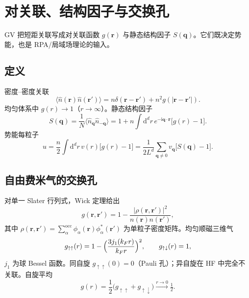 \section{对关联、结构因子与交换孔}

GV 把短距关联写成对关联函数 $g(\mathbf{r})$ 与静态结构因子 $S(\mathbf{q})$。它们既决定势能，也是 RPA/局域场理论的输入。

\subsection{定义}

密度--密度关联
\begin{equation}
  \bigl\langle
  \hat n(\mathbf{r})\hat n(\mathbf{r}')
  \bigr\rangle
  =n\delta(\mathbf{r}-\mathbf{r}')
  +n^2 g(|\mathbf{r}-\mathbf{r}'|).
\end{equation}
均匀体系中 $g(r)\to1$（$r\to\infty$）。静态结构因子
\begin{equation}
  S(\mathbf{q})
  =\frac{1}{N}
  \bigl\langle
  \hat n_{\mathbf{q}}\hat n_{-\mathbf{q}}
  \bigr\rangle
  =1+n\int\mathrm{d}^d r\,e^{-\mathrm{i}\mathbf{q}\cdot\mathbf{r}}
  \bigl[g(r)-1\bigr].
\label{eq:Sq_gr}
\end{equation}
势能每粒子
\begin{equation}
  u
  =\frac{n}{2}
  \int\mathrm{d}^d r\,v(r)\bigl[g(r)-1\bigr]
  =\frac{1}{2L^d}
  \sum_{\mathbf{q}\neq0}
  v_{\mathbf{q}}\bigl[S(\mathbf{q})-1\bigr].
\label{eq:u_from_S}
\end{equation}

\subsection{自由费米气的交换孔}

对单一 Slater 行列式，Wick 定理给出
\begin{equation}
  g(\mathbf{r},\mathbf{r}')
  =1-\frac{|\rho(\mathbf{r},\mathbf{r}')|^2}{n(\mathbf{r})n(\mathbf{r}')},
\label{eq:g_slater}
\end{equation}
其中 $\rho(\mathbf{r},\mathbf{r}')=\sum_{\alpha}^{\mathrm{occ}}\phi_\alpha(\mathbf{r})\phi_\alpha^*(\mathbf{r}')$ 为单粒子密度矩阵。均匀顺磁三维气
\begin{equation}
  g_{\uparrow\uparrow}(r)
  =1-\Bigl(\frac{3j_1(k_F r)}{k_F r}\Bigr)^2,
  \qquad
  g_{\uparrow\downarrow}(r)=1,
\end{equation}
$j_1$ 为球 Bessel 函数。同自旋 $g_{\uparrow\uparrow}(0)=0$（Pauli 孔）；异自旋在 HF 中完全不关联。自旋平均
\begin{equation}
  g(r)
  =\frac12\bigl(g_{\uparrow\uparrow}+g_{\uparrow\downarrow}\bigr)
  \xrightarrow{r\to0}\tfrac12.
\end{equation}

